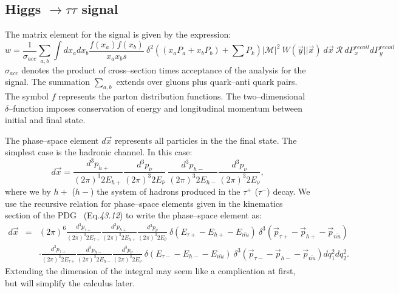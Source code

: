 \subsection{Higgs $\rightarrow \tau\tau$ signal}

The matrix element for the signal is given by the expression:
\begin{equation}
w = \frac{1}{\sigma_{acc}} \sum_{a,b} \int dx_{a} dx_{b} \frac{f(x_{a}) f(x_{b})}{x_{a} x_{b} s} \ \delta^2((x_a P_a + x_b P_b) + \sum P_{k}) 
  \vert \mathcal{M} \vert^2 \ W(\vec{y}|\vert\vec{x}) \ d\vec{x} \ \mathcal{R} \ dP_{x}^{recoil} dP_{y}^{recoil} 
\label{eq:meSignal}
\end{equation}
$\sigma_{acc}$ denotes the product of cross--section times acceptance of the analysis for the signal.
The summation $\sum_{a,b}$ extends over gluons plus quark--anti quark pairs.
The symbol $f$ represents the parton distribution functions.
The two--dimensional $\delta$--function imposes conservation of energy and longitudinal momentum between initial and final state.

The phase--space element $d\vec{x}$ represents all particles in the the final state.
The simplest case is the hadronic channel. In this case:
\begin{equation*}
d\vec{x} = \frac{d^3p_{h+}}{(2\pi)^3 2 E_{h+}} \frac{d^3p_{\bar{\nu}}}{(2\pi)^3 2 E_{\bar{\nu}}} \ \frac{d^3p_{h-}}{(2\pi)^3 2 E_{h-}} \frac{d^3p_{\nu}}{(2\pi)^3 2 E_{\nu}},
\end{equation*}
where we by $h+$ ($h-$) the system of hadrons produced in the $\tau^{+}$ ($\tau^{-}$) decay.
We use the recursive relation for phase--space elements given in the kinematics section of the PDG~\cite{PDG} (Eq.{\it 43.12}) to write the phase--space element as:
\begin{eqnarray*}
d\vec{x} & = & (2\pi)^6 \frac{d^3p_{\tau+}}{(2\pi)^3 2 E_{\tau+}} \frac{d^3p_{h+}}{(2\pi)^3 2 E_{h+}} \frac{d^3p_{\bar{\nu}}}{(2\pi)^3 2 E_{\bar{\nu}}}
  \ \delta(E_{\tau+} - E_{h+} - E_{\bar{nu}}) \ \delta^3(\vec{p}_{\tau+} - \vec{p}_{h+} - \vec{p}_{\bar{nu}}) \\
  & & \cdot \frac{d^3p_{\tau+}}{(2\pi)^3 2 E_{\tau+}} \frac{d^3p_{h-}}{(2\pi)^3 2 E_{h-}} \frac{d^3p_{\nu}}{(2\pi)^3 2 E_{\nu}} 
  \ \delta(E_{\tau-} - E_{h-} - E_{\bar{nu}}) \ \delta^3(\vec{p}_{\tau-} - \vec{p}_{h-} - \vec{p}_{\bar{nu}}) dq_{1}^2 dq_{2}^2.   
\end{eqnarray*}
Extending the dimension of the integral may seem like a complication at first, but will simplify the calculus later.

